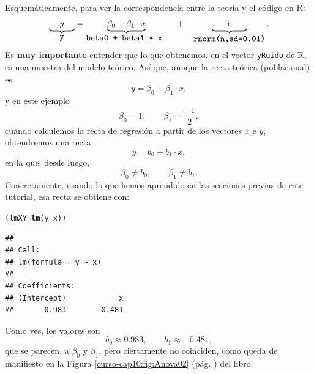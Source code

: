 \documentclass[10pt,a4paper]{article}\usepackage[]{graphicx}\usepackage[]{color}
\makeatletter
\newcommand{\hlopt}[1]{\textcolor[rgb]{0,0,0}{#1}}%
\newcommand{\hlstd}[1]{\textcolor[rgb]{0.345,0.345,0.345}{#1}}%
\newcommand{\hlkwb}[1]{\textcolor[rgb]{0.69,0.353,0.396}{#1}}%
\newcommand{\hlkwd}[1]{\textcolor[rgb]{0.737,0.353,0.396}{\textbf{#1}}}%
\newenvironment{kframe}{%
 \def\at@end@of@kframe{}%
 \ifinner\ifhmode%
  \def\at@end@of@kframe{\end{minipage}}%
  \begin{minipage}{\columnwidth}%
 \fi\fi%
 \def\FrameCommand##1{\hskip\@totalleftmargin \hskip-\fboxsep
 \colorbox{shadecolor}{##1}\hskip-\fboxsep
     \hskip-\linewidth \hskip-\@totalleftmargin \hskip\columnwidth}%
 \MakeFramed {\advance\hsize-\width
   \@totalleftmargin\z@ \linewidth\hsize
   \@setminipage}}%
 {\par\unskip\endMakeFramed%
 \at@end@of@kframe}
\newenvironment{knitrout}{}{} %
\makeatother
\begin{document}
Esquemáticamente, para ver la correspondencia entre la teoría y el código en R:
\[
        \underbrace{\phantom{\beta\beta}y\phantom{\beta\beta}}_{\mbox{\tt y}}=
        \underbrace{\beta_0 +\beta_1\cdot x}_{\mbox{\tt beta0 + beta1 * x }}
        \quad + \quad
        \underbrace{\phantom{\beta\beta\beta}\epsilon\phantom{\beta\beta\beta}}_{\mbox{\tt rnorm(n,sd=0.01)}}
        .
\]
Es {\bf muy importante} entender que lo que obtenemos, en el vector {\tt yRuido} de R, es una muestra del modelo teórico. Así que, aunque la recta teórica (poblacional) es
\[y=\beta_0+\beta_1\cdot x,\]
y en este ejemplo
\[\beta_0 = 1,\qquad \beta_1 = \dfrac{-1}{2},\]
cuando calculemos la recta de regresión a partir de los vectores $x$ e $y$, obtendremos una recta
\[y=b_0+b_1\cdot x,\]
en la que, desde luego,
\[\beta_0 \neq b_0,\qquad \beta_1\neq b_1 .\]
Concretamente, usando lo que hemos aprendido en las secciones previas de este tutorial, esa recta se obtiene con:
\begin{knitrout}
\color{fgcolor}\begin{kframe}
\begin{alltt}
\hlstd{(lmXY}\hlkwb{=} \hlkwd{lm}\hlstd{(y}\hlopt{~}\hlstd{x) )}
\end{alltt}
\begin{verbatim}
## 
## Call:
## lm(formula = y ~ x)
## 
## Coefficients:
## (Intercept)            x  
##       0.983       -0.481
\end{verbatim}
\end{kframe}
\end{knitrout}
Como ves, los valores son
\[
    b_0\approx 0.983,\qquad
    b_1\approx \ensuremath{-0.481},
\]
que se parecen, a $\beta_0$ y $\beta_1$, pero ciertamente no coinciden, como queda de manifiesto en la Figura \ref{curso-cap10:fig:Anova02} (pág. \pageref{curso-cap10:fig:Anova02}) del libro.
\end{document}

